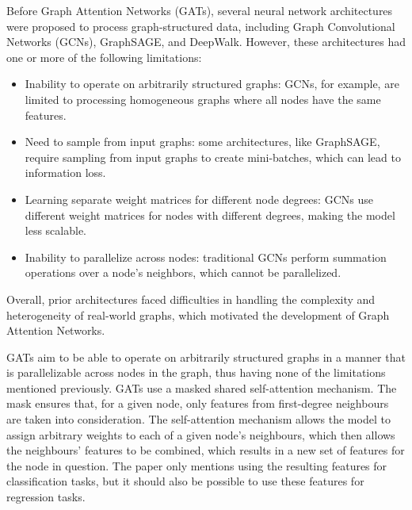 Before Graph Attention Networks (GATs), several neural network architectures were proposed to process graph-structured data, including Graph Convolutional Networks (GCNs), GraphSAGE, and DeepWalk. However, these architectures had one or more of the following limitations:

\begin{itemize}
    \item Inability to operate on arbitrarily structured graphs: GCNs, for example, are limited to processing homogeneous graphs where all nodes have the same features.

    \item Need to sample from input graphs: some architectures, like GraphSAGE, require sampling from input graphs to create mini-batches, which can lead to information loss.

    \item Learning separate weight matrices for different node degrees: GCNs use different weight matrices for nodes with different degrees, making the model less scalable.

    \item Inability to parallelize across nodes: traditional GCNs perform summation operations over a node's neighbors, which cannot be parallelized.
\end{itemize}

Overall, prior architectures faced difficulties in handling the complexity and heterogeneity of real-world graphs, which motivated the development of Graph Attention Networks.

GATs aim to be able to operate on arbitrarily structured graphs in a manner that is parallelizable across nodes in the graph, thus having none of the
limitations mentioned previously.
GATs use a masked shared self-attention mechanism.
The mask ensures that, for a given node, only features from first-degree neighbours are taken into consideration.
The self-attention mechanism allows the model to assign arbitrary weights to each of a given
node's neighbours, which then allows the neighbours' features to be
combined, which results in a new set of features for the node in question.
The paper only mentions using the resulting features for classification
tasks, but it should also be possible to use these features for regression
tasks.